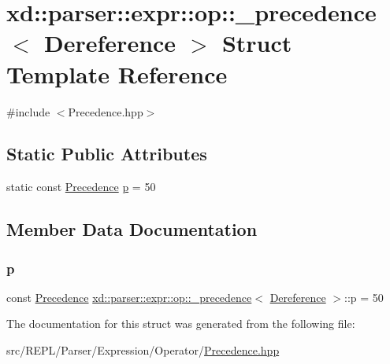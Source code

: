 \hypertarget{structxd_1_1parser_1_1expr_1_1op_1_1__precedence_3_01_dereference_01_4}{}\section{xd\+:\+:parser\+:\+:expr\+:\+:op\+:\+:\+\_\+precedence$<$ Dereference $>$ Struct Template Reference}
\label{structxd_1_1parser_1_1expr_1_1op_1_1__precedence_3_01_dereference_01_4}


{\ttfamily \#include $<$Precedence.\+hpp$>$}

\subsection*{Static Public Attributes}
\begin{DoxyCompactItemize}
\item 
static const \mbox{\hyperlink{namespacexd_1_1parser_1_1expr_1_1op_ae27abd4a02cd8125663cb2bacac299b2}{Precedence}} \mbox{\hyperlink{structxd_1_1parser_1_1expr_1_1op_1_1__precedence_3_01_dereference_01_4_a68b4758b3126ed0bdf4bd91ac5129f96}{p}} = 50
\end{DoxyCompactItemize}


\subsection{Member Data Documentation}
\mbox{\label{structxd_1_1parser_1_1expr_1_1op_1_1__precedence_3_01_dereference_01_4_a68b4758b3126ed0bdf4bd91ac5129f96}} 
\subsubsection{\texorpdfstring{p}{p}}
{\footnotesize\ttfamily const \mbox{\hyperlink{namespacexd_1_1parser_1_1expr_1_1op_ae27abd4a02cd8125663cb2bacac299b2}{Precedence}} \mbox{\hyperlink{structxd_1_1parser_1_1expr_1_1op_1_1__precedence}{xd\+::parser\+::expr\+::op\+::\+\_\+precedence}}$<$ \mbox{\hyperlink{structxd_1_1parser_1_1expr_1_1op_1_1_dereference}{Dereference}} $>$\+::p = 50\hspace{0.3cm}{\ttfamily [static]}}



The documentation for this struct was generated from the following file\+:\begin{DoxyCompactItemize}
\item 
src/\+R\+E\+P\+L/\+Parser/\+Expression/\+Operator/\mbox{\hyperlink{_precedence_8hpp}{Precedence.\+hpp}}\end{DoxyCompactItemize}
